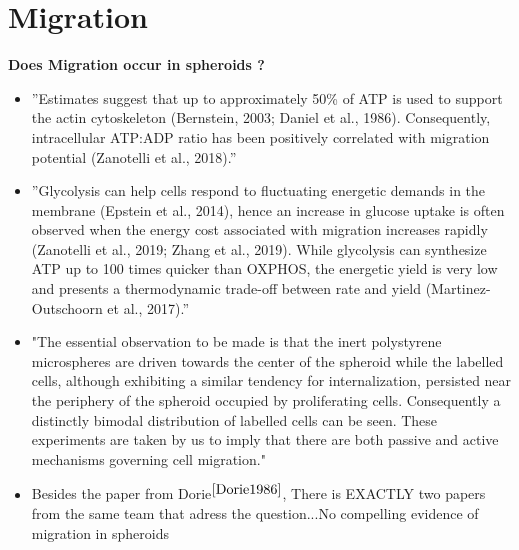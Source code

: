 \documentclass[11pt,a4paper]{article}
\begin{document}
\section{Migration}
\textbf{Does Migration occur in spheroids ?}
\begin{itemize}
\item ”Estimates suggest that up to approximately 50\% of ATP is used to support the actin cytoskeleton (Bernstein, 2003; Daniel et al., 1986). Consequently, intracellular ATP:ADP ratio has been positively correlated with migration potential (Zanotelli et al., 2018).”\cite{Zanotelli2021}
\item ”Glycolysis can help cells respond to fluctuating energetic demands in the membrane (Epstein et al., 2014), hence an increase in glucose uptake is often observed when the
energy cost associated with migration increases rapidly (Zanotelli et al., 2019; Zhang et al., 2019). While glycolysis can synthesize ATP up to 100 times quicker than OXPHOS,
the energetic yield is very low and presents a thermodynamic trade-off between rate and yield (Martinez-Outschoorn et al., 2017).”
\item "The essential observation to be
made is that the inert polystyrene microspheres are driven towards the center of the spheroid while the labelled cells, although exhibiting a similar tendency for internalization, persisted near the periphery of the spheroid occupied by proliferating cells. Consequently a distinctly bimodal distribution of labelled cells can be seen. These experiments are taken by us to imply that there are both passive and active mechanisms governing cell migration."
\item Besides the paper from Dorie$^{\cite{Dorie1986}}$, There is EXACTLY two papers from the same team that adress the question...No compelling evidence of migration in spheroids
\end{itemize}
\end{document}
